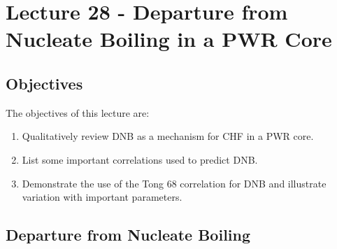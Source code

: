\chapter{Lecture 28 - Departure from Nucleate Boiling in a PWR Core}
\label{ch:ch28}
\section{Objectives}
The objectives of this lecture are:
\begin{enumerate}
\item Qualitatively review DNB as a mechanism for CHF in a PWR core.
\item List some important correlations used to predict DNB.
\item Demonstrate the use of the Tong 68 correlation for DNB and illustrate variation with important parameters.
\end{enumerate}

\section{Departure from Nucleate Boiling}

